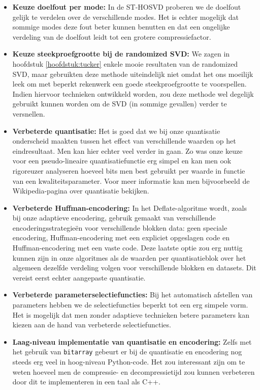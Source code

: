 \begin{itemize}
\item \textbf{Keuze doelfout per mode:} In de ST-HOSVD proberen we de doelfout gelijk te verdelen over de verschillende modes. Het is echter mogelijk dat sommige modes deze fout beter kunnen benutten en dat een ongelijke verdeling van de doelfout leidt tot een grotere compressiefactor.
\item \textbf{Keuze steekproefgrootte bij de randomized SVD:} We zagen in hoofdstuk \ref{hoofdstuk:tucker} enkele mooie resultaten van de randomized SVD, maar gebruikten deze methode uiteindelijk niet omdat het ons moeilijk leek om met beperkt rekenwerk een goede steekproefgrootte te voorspellen. Indien hiervoor technieken ontwikkeld worden, zou deze methode wel degelijk gebruikt kunnen worden om de SVD (in sommige gevallen) verder te versnellen.
\item \textbf{Verbeterde quantisatie:} Het is goed dat we bij onze quantisatie onderscheid maakten tussen het effect van verschillende waarden op het eindresultaat. Men kan hier echter veel verder in gaan. Zo was onze keuze voor een pseudo-lineaire quantisatiefunctie erg simpel en kan men ook rigoreuzer analyseren hoeveel bits men best gebruikt per waarde in functie van een kwaliteitsparameter. Voor meer informatie kan men bijvoorbeeld de Wikipedia-pagina over quantisatie \cite{ref:quantization} bekijken.
\item \textbf{Verbeterde Huffman-encodering:} In het Deflate-algoritme \cite{ref:deflate} wordt, zoals bij onze adaptieve encodering, gebruik gemaakt van verschillende encoderingsstrategie\"en voor verschillende blokken data: geen speciale encodering, Huffman-encodering met een expliciet opgeslagen code en Huffman-encodering met een vaste code. Deze laatste optie zou erg nuttig kunnen zijn in onze algoritmes als de waarden per quantisatieblok over het algemeen dezelfde verdeling volgen voor verschillende blokken en datasets. Dit vereist eerst echter aangepaste quantisatie.
\item \textbf{Verbeterde parameterselectiefuncties:} Bij het automatisch afstellen van parameters hebben we de selectiefuncties beperkt tot een erg simpele vorm. Het is mogelijk dat men zonder adaptieve technieken betere parameters kan kiezen aan de hand van verbeterde selectiefuncties.
\item \textbf{Laag-niveau implementatie van quantisatie en encodering:} Zelfs met het gebruik van \texttt{bitarray} \cite{ref:bitarray} gebeurt er bij de quantisatie en encodering nog steeds erg veel in hoog-niveau Python-code. Het zou interessant zijn om te weten hoeveel men de compressie- en decompressietijd zou kunnen verbeteren door dit te implementeren in een taal als C++.
\end{itemize}